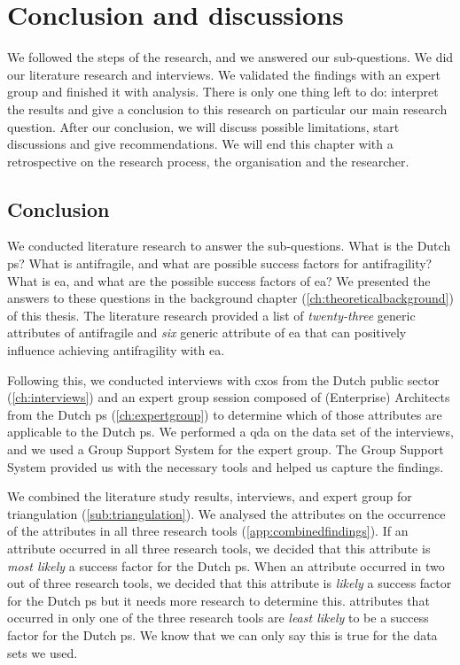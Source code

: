 \chapter{Conclusion and discussions}
\label{ch:conclusionanddiscussions}
We followed the steps of the research, and we answered our sub-questions. We did our literature research and interviews. We validated the findings with an expert group and finished it with analysis. There is only one thing left to do: interpret the results and give a conclusion to this research on particular our main research question. After our conclusion, we will discuss possible limitations, start discussions and give recommendations. We will end this chapter with a retrospective on the research process, the organisation and the researcher.

\section{Conclusion}
\label{sec:conclusion}
We conducted literature research to answer the sub-questions. What is the Dutch \gls{ps}? What is \gls{antifragile}, and what are possible success factors for \gls{antifragility}? What is \gls{ea}, and what are the possible success factors of \gls{ea}? We presented the answers to these questions in the background chapter (\cref{ch:theoreticalbackground}) of this thesis. The literature research provided a list of \textit{twenty-three} generic \glspl{attribute} of \gls{antifragile} and \textit{six} generic \gls{attribute} of \gls{ea} that can positively influence achieving \gls{antifragility} with \gls{ea}.

Following this, we conducted interviews with \glspl{cxo} from the Dutch public sector (\cref{ch:interviews}) and an expert group session composed of (Enterprise) Architects from the Dutch \gls{ps} (\cref{ch:expertgroup}) to determine which of those \glspl{attribute} are applicable to the Dutch \gls{ps}. We performed a \gls{qda} on the data set of the interviews, and we used a Group Support System for the expert group. The Group Support System provided us with the necessary tools and helped us capture the findings. 

We combined the literature study results, interviews, and expert group for \gls{triangulation} (\cref{sub:triangulation}). We analysed the \glspl{attribute} on the occurrence of the \glspl{attribute} in all three research tools (\cref{app:combinedfindings}). If an \gls{attribute} occurred in all three research tools, we decided that this \gls{attribute} is \textit{most likely} a success factor for the Dutch \gls{ps}. When an \gls{attribute} occurred in two out of three research tools, we decided that this \gls{attribute} is \textit{likely} a success factor for the Dutch \gls{ps} but it needs more research to determine this. \Glspl{attribute} that occurred in only one of the three research tools are \textit{least likely} to be a success factor for the Dutch \gls{ps}. We know that we can only say this is true for the data sets we used.

